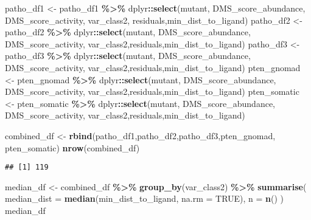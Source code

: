 \documentclass[
]{article}
\newenvironment{Shaded}{\begin{snugshade}}{\end{snugshade}}
\newcommand{\AttributeTok}[1]{\textcolor[rgb]{0.13,0.29,0.53}{#1}}
\newcommand{\ConstantTok}[1]{\textcolor[rgb]{0.56,0.35,0.01}{#1}}
\newcommand{\FunctionTok}[1]{\textcolor[rgb]{0.13,0.29,0.53}{\textbf{#1}}}
\newcommand{\NormalTok}[1]{#1}
\newcommand{\OtherTok}[1]{\textcolor[rgb]{0.56,0.35,0.01}{#1}}
\newcommand{\SpecialCharTok}[1]{\textcolor[rgb]{0.81,0.36,0.00}{\textbf{#1}}}
\begin{document}
\begin{Shaded}
\begin{Highlighting}[]
\NormalTok{patho\_df1 }\OtherTok{\textless{}{-}}\NormalTok{ patho\_df1 }\SpecialCharTok{\%\textgreater{}\%}\NormalTok{ dplyr}\SpecialCharTok{::}\FunctionTok{select}\NormalTok{(mutant, DMS\_score\_abundance, DMS\_score\_activity, var\_class2, residuals,min\_dist\_to\_ligand)}
\NormalTok{patho\_df2 }\OtherTok{\textless{}{-}}\NormalTok{ patho\_df2 }\SpecialCharTok{\%\textgreater{}\%}\NormalTok{ dplyr}\SpecialCharTok{::}\FunctionTok{select}\NormalTok{(mutant, DMS\_score\_abundance, DMS\_score\_activity, var\_class2,residuals,min\_dist\_to\_ligand)}
\NormalTok{patho\_df3 }\OtherTok{\textless{}{-}}\NormalTok{ patho\_df3 }\SpecialCharTok{\%\textgreater{}\%}\NormalTok{ dplyr}\SpecialCharTok{::}\FunctionTok{select}\NormalTok{(mutant, DMS\_score\_abundance, DMS\_score\_activity, var\_class2,residuals,min\_dist\_to\_ligand)}
\NormalTok{pten\_gnomad }\OtherTok{\textless{}{-}}\NormalTok{ pten\_gnomad }\SpecialCharTok{\%\textgreater{}\%}\NormalTok{ dplyr}\SpecialCharTok{::}\FunctionTok{select}\NormalTok{(mutant, DMS\_score\_abundance, DMS\_score\_activity, var\_class2,residuals,min\_dist\_to\_ligand)}
\NormalTok{pten\_somatic }\OtherTok{\textless{}{-}}\NormalTok{ pten\_somatic }\SpecialCharTok{\%\textgreater{}\%}\NormalTok{ dplyr}\SpecialCharTok{::}\FunctionTok{select}\NormalTok{(mutant, DMS\_score\_abundance, DMS\_score\_activity, var\_class2,residuals,min\_dist\_to\_ligand)}

\NormalTok{combined\_df }\OtherTok{\textless{}{-}} \FunctionTok{rbind}\NormalTok{(patho\_df1,patho\_df2,patho\_df3,pten\_gnomad, pten\_somatic)}
\FunctionTok{nrow}\NormalTok{(combined\_df)}
\end{Highlighting}
\end{Shaded}

\begin{verbatim}
## [1] 119
\end{verbatim}

\begin{Shaded}
\begin{Highlighting}[]
\NormalTok{median\_df }\OtherTok{\textless{}{-}}\NormalTok{ combined\_df }\SpecialCharTok{\%\textgreater{}\%}
  \FunctionTok{group\_by}\NormalTok{(var\_class2) }\SpecialCharTok{\%\textgreater{}\%}
  \FunctionTok{summarise}\NormalTok{(}
    \AttributeTok{median\_dist =} \FunctionTok{median}\NormalTok{(min\_dist\_to\_ligand, }\AttributeTok{na.rm =} \ConstantTok{TRUE}\NormalTok{),}
    \AttributeTok{n =} \FunctionTok{n}\NormalTok{()}
\NormalTok{  )}
\NormalTok{median\_df}
\end{Highlighting}
\end{Shaded}
\end{document}
